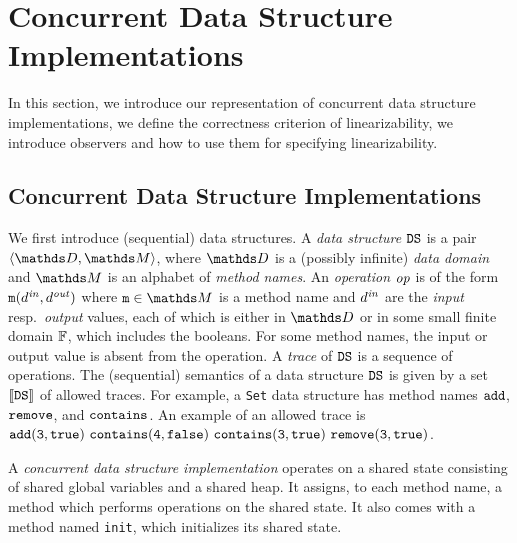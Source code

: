 \section{Concurrent Data Structure Implementations}
\label{programs:section}
In this section, we introduce our representation of
concurrent data structure implementations, we define the correctness criterion of
linearizability, we introduce observers and how to use them for specifying
linearizability.

\subsection{Concurrent Data Structure Implementations}

We first introduce (sequential) data structures.
A {\it data structure} ${\tt DS}$ is a pair
$\tuple{\ddomain,\malphabet}$,
where $\ddomain$ is a (possibly infinite) {\it data domain} and 
$\malphabet$ is an alphabet of {\em method names}.
%
%
An {\it operation} 
${\it op}$ is of the form
${\tt m}(d^{\it in},d^{\it out})$ where 
$\mname\in\malphabet$ is a method name and 
$d^{\it in}$ are the {\it input} resp.\ {\it output} values, each of which
is either in $\ddomain$ or in some small finite domain $\mathbb{F}$, which
includes the booleans.
%
For some method names, the input or output value is absent from the operation.
A {\it trace} of ${\tt DS}$ is a sequence of operations.
The (sequential) semantics of a data structure ${\tt DS}$ is given by
a set $\left\llbracket{{\tt DS}}\right\rrbracket$ of allowed traces.
For example, a {\tt Set} data structure has method names
$\tt add$, $\tt remove$, and $\tt contains$. An example of an allowed trace
is ${\tt add(3,true)\ contains(4,false)\ contains(3,true) \ remove(3,true)}$.
%


A {\em concurrent data structure implementation} operates on a shared
state consisting of shared global variables and a shared heap.
It assigns, to each method name,  a method which performs operations
%
on the shared state. It
also comes with a method named {\tt init}, which initializes its shared state.

